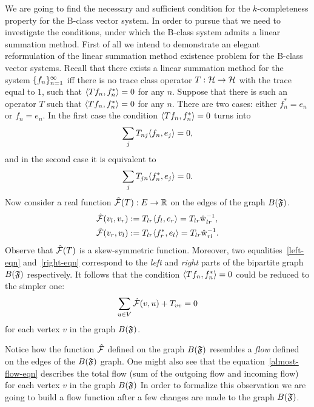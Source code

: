 \documentclass[12pt]{article}
\begin{document}
    We are going to find the necessary and sufficient condition for the $k$-completeness property for the B-class vector system.
    In order to pursue that we need to investigate the conditions, under which the B-class system admits a linear summation method.
    First of all we intend to demonstrate an elegant reformulation of the linear summation method existence problem for
      the B-class vector systems.
    Recall that there exists a linear summation method for the system $\seq{f}$
      iff there is no trace class operator $T: \cal{H} \to \cal{H}$ with the trace equal to $1$,
      such that $\inner{Tf_n}{f_n^*} = 0$ for any $n$.
    Suppose that there is such an operator $T$ such that $\inner{Tf_n}{f_n^*} = 0$ for any $n$.
    There are two cases: either $f^*_n = e_n$ or $f_n = e_n$.
    In the first case the condition $\inner{Tf_n}{f_n^*} = 0$ turns into
    \begin{equation}
        \label{left-eqn}
        \sum_j T_{nj} \inner{f_n}{e_j} = 0,
    \end{equation}
    and in the second case it is equivalent to 
    \begin{equation}
        \label{right-eqn}
        \sum_j T_{jn} \inner{f^*_n}{e_j} = 0.
    \end{equation}
    Now consider a real function $\flowsgn(T): E \to \mathbb{R}$
    on the edges of the graph $B(\fsys)$.
    \begin{align*}
        &\flowsgn(v_l, v_r) := T_{lr} \inner{f_l}{e_r} = T_{lr} \wt_{lr}^{-1},\\
        &\flowsgn(v_r, v_l) := T_{lr} \inner{f^*_r}{e_l} = T_{lr} \wt_{rl}^{-1}.
    \end{align*}
    Observe that $\flowsgn(T)$ is a skew-symmetric function.
    Moreover, two equalities~\eqref{left-eqn} and~\eqref{right-eqn} correspond to the \emph{left} and \emph{right}
      parts of the bipartite graph $B(\fsys)$ respectively.
    It follows that the condition $\inner{Tf_n}{f_n^*} = 0$ could be reduced to the simpler one:
    \begin{equation}
      \label{almost-flow-eqn}
      \sum_{u \in V} \flowsgn(v, u) + T_{vv} = 0
    \end{equation}
      for each vertex $v$ in the graph $B(\fsys)$.
    \begin{remark}
      Notice how the function $\flow$ defined on the graph $B(\fsys)$ resembles
      a \emph{flow} defined on the edges of the $B(\fsys)$ graph.
      One might also see that the equation~\eqref{almost-flow-eqn} describes the total flow (sum of the outgoing flow and incoming flow) 
      for each vertex $v$ in the graph $B(\fsys)$
      In order to formalize this observation we are going to build a flow function
      after a few changes are made to the graph $B(\fsys)$.
    \end{remark}
\end{document}
